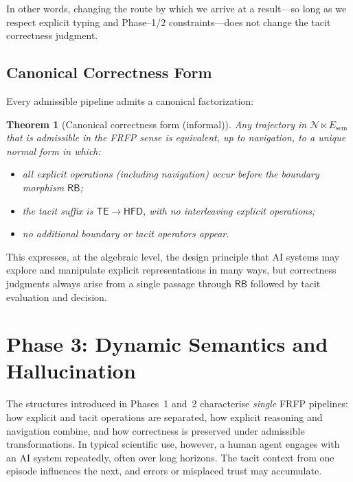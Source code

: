 \documentclass[11pt]{article}
\newtheorem{theorem}{Theorem}[section]
\theoremstyle{definition}
\newcommand{\Ncat}{\mathcal{N}} %
\newcommand{\RB}{\mathsf{RB}}   %
\newcommand{\TE}{\mathsf{TE}}
\newcommand{\HFD}{\mathsf{HFD}}
\begin{document}
In other words, changing the route by which we arrive at a result---so
long as we respect explicit typing and Phase--1/2 constraints---does not
change the tacit correctness judgment.

\subsection{Canonical Correctness Form}

Every admissible pipeline admits a canonical factorization:

\begin{theorem}[Canonical correctness form (informal)]
Any trajectory in \(\Ncat \ltimes E_{\mathrm{sem}}\) that is admissible
in the FRFP sense is equivalent, up to navigation, to a unique normal
form in which:
\begin{itemize}[leftmargin=2em]
  \item all explicit operations (including navigation) occur before the
        boundary morphism \(\RB\);
  \item the tacit suffix is \(\TE \to \HFD\), with no interleaving
        explicit operations;
  \item no additional boundary or tacit operators appear.
\end{itemize}
\end{theorem}

This expresses, at the algebraic level, the design principle that AI
systems may explore and manipulate explicit representations in many
ways, but correctness judgments always arise from a single passage
through \(\RB\) followed by tacit evaluation and decision.

\section{Phase 3: Dynamic Semantics and Hallucination}
\label{sec:phase3-dynamics}

The structures introduced in Phases~1 and~2 characterise \emph{single}
FRFP pipelines: how explicit and tacit operations are separated, how
explicit reasoning and navigation combine, and how correctness is
preserved under admissible transformations. In typical scientific use,
however, a human agent engages with an AI system repeatedly, often over
long horizons. The tacit context from one episode influences the next,
and errors or misplaced trust may accumulate.
\end{document}
